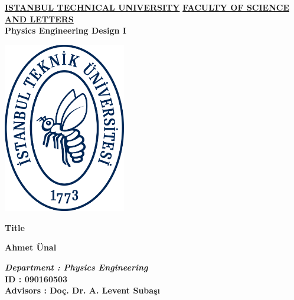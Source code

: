 \documentclass[12pt]{article}
\begin{document}
\begin{titlepage}
\begin{center}
\vspace*{1.5cm}\LARGE\textbf{\underline{ISTANBUL TECHNICAL UNIVERSITY}}\vspace*{0.6cm}
\Large\textbf{\underline{FACULTY OF SCIENCE AND LETTERS}}\vspace*{0.6cm}\\
\Large\textbf{Physics Engineering Design I}\vspace*{0.8cm}

\includegraphics[width=0.4\textwidth]{itu-istanbul-teknik_universitesi-logo.png}

\vspace{0.5cm}
\Large\textbf{Title}\vspace{0.5cm}

\large\textbf{Ahmet Ünal}\vspace{0.8cm}

\small\textbf{}

\end{center}
\begin{flushleft}
\textbf{\textit{Department \hspace*{1.7mm}: Physics Engineering}}\\ \vspace{0.4cm}
\textbf{ID \hspace{1.8cm}: 090160503}\\ \vspace{0.4cm}
\textbf{Advisors \hspace{0.85cm}: Doç. Dr. A. Levent Subaşı} \vspace{0.5cm}

\end{flushleft}



\end{titlepage}
\end{document}
